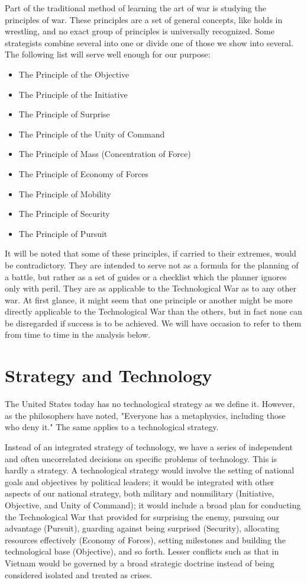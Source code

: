 Part of the traditional method of learning the art of war is studying the principles of war. These principles are a set of general concepts, like holds in wrestling, and no exact group of principles is universally recognized. Some strategists combine several into one or divide one of those we show into several. The following list will serve well enough for our purpose:

\begin{itemize}
    \item The Principle of the Objective
    \item The Principle of the Initiative
    \item The Principle of Surprise
    \item The Principle of the Unity of Command
    \item The Principle of Mass (Concentration of Force)
    \item The Principle of Economy of Forces
    \item The Principle of Mobility
    \item The Principle of Security
    \item The Principle of Pursuit
\end{itemize}

It will be noted that some of these principles, if carried to their extremes, would be contradictory. They are intended to serve not as a formula for the planning of a battle, but rather as a set of guides or a checklist which the planner ignores only with peril. They are as applicable to the Technological War as to any other war. At first glance, it might seem that one principle or another might be more directly applicable to the Technological War than the others, but in fact none can be disregarded if success is to be achieved. We will have occasion to refer to them from time to time in the analysis below.

\section{Strategy and Technology}
The United States today has no technological strategy as we define it. However, as the philosophers have noted, "Everyone has a metaphysics, including those who deny it." The same applies to a technological strategy.

Instead of an integrated strategy of technology, we have a series of independent and often uncorrelated decisions on specific problems of technology. This is hardly a strategy. A technological strategy would involve the setting of national goals and objectives by political leaders; it would be integrated with other aspects of our national strategy, both military and nonmilitary (Initiative, Objective, and Unity of Command); it would include a broad plan for conducting the Technological War that provided for surprising the enemy, pursuing our advantage (Pursuit), guarding against being surprised (Security), allocating resources effectively (Economy of Forces), setting milestones and building the technological base (Objective), and so forth. Lesser conflicts such as that in Vietnam would be governed by a broad strategic doctrine instead of being considered isolated and treated as crises.

